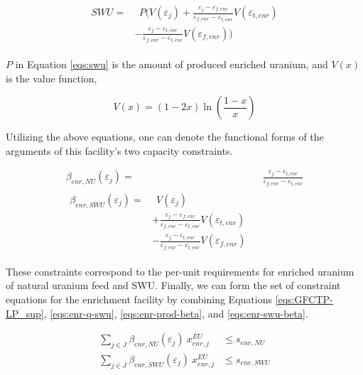 \begin{align}
\begin{split}
\label{eqs:swu}
SWU = & \:\: P ( V(\varepsilon_{j}) 
      + \frac{\varepsilon_{j} - \varepsilon_{f,enr}}
               {\varepsilon_{f,enr} - \varepsilon_{t,enr}} V(\varepsilon_{t,enr}) \\
      & - \frac{\varepsilon_{j} - \varepsilon_{t,enr}}
               {\varepsilon_{f,enr} - \varepsilon_{t,enr}} V(\varepsilon_{f,enr}) )
\end{split}
\end{align}

$P$ in Equation \ref{eqs:swu} is the amount of produced enriched uranium, and
$V(x)$ is the value function,

\begin{equation}\label{eqs:value}
  V(x) = (1-2x) \ln \left(\frac{1-x}{x}\right)
\end{equation}

Utilizing the above equations, one can denote the functional forms of the
arguments of this facility's two capacity constraints.

\begin{align}
\label{eqs:enr-prod-beta}
\beta_{enr,NU}(\varepsilon_{j}) = & \:\: \frac{\varepsilon_{j} - \varepsilon_{t,enr}}
                                      {\varepsilon_{f,enr} - \varepsilon_{t,enr}} \\
\begin{split}
\label{eqs:enr-swu-beta}
\beta_{enr,SWU}(\varepsilon_{j}) = & \:\: V(\varepsilon_{j}) \\
                         & + \frac{\varepsilon_{j} - \varepsilon_{f,enr}}
                                  {\varepsilon_{f,enr} - \varepsilon_{t,enr}} V(\varepsilon_{t,enr}) \\
                         & - \frac{\varepsilon_{j} - \varepsilon_{t,enr}}
                                  {\varepsilon_{f,enr} - \varepsilon_{t,enr}} V(\varepsilon_{f,enr})
\end{split}
\end{align}

These constraints correspond to the per-unit requirements for enriched uranium
of natural uranium feed and SWU. Finally, we can form the set of constraint
equations for the enrichment facility by combining
Equations \ref{eqs:GFCTP-LP_sup}, \ref{eqs:enr-q-swu},
\ref{eqs:enr-prod-beta}, and \ref{eqs:enr-swu-beta}.

\begin{align}
\label{eqs:enr-prod-constr}
\sum_{j \in J}\beta_{enr,NU}(\varepsilon_{j}) \: x_{enr,j}^{EU}  & \leq s_{enr,NU} \\
\label{eqs:enr-swu-constr}
\sum_{j \in J}\beta_{enr,SWU}(\varepsilon_{j}) \: x_{enr,j}^{EU} & \leq s_{enr,SWU}
\end{align}

